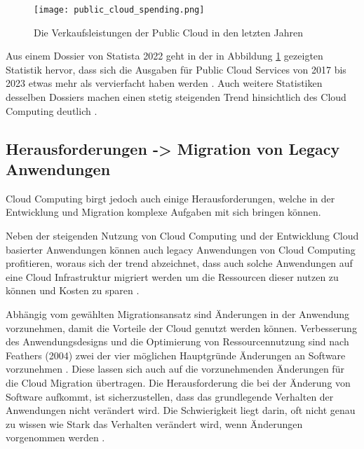 \begin{figure}[h]
    \texttt{[image: public\_cloud\_spending.png]}
    \caption{Die Verkaufsleistungen der Public Cloud in den letzten Jahren \cite[S. 8]{Statista2022}}
    \label{fig:public_cloud_spending}
\end{figure}

Aus einem Dossier von Statista 2022 geht in der in Abbildung \ref{fig:public_cloud_spending} gezeigten Statistik hervor, dass sich die Ausgaben für Public Cloud Services von 2017 bis 2023 etwas mehr als vervierfacht haben werden \cite[Vgl.][S. 8]{Statista2022}. Auch weitere Statistiken desselben Dossiers machen einen stetig steigenden Trend hinsichtlich des Cloud Computing deutlich \cite[Vgl. unter anderem][S. 11ff]{Statista2022}. 

\pagebreak

\subsection{Herausforderungen -> Migration von Legacy Anwendungen}
Cloud Computing birgt jedoch auch einige Herausforderungen, welche in der Entwicklung und Migration komplexe Aufgaben mit sich bringen können.

Neben der steigenden Nutzung von Cloud Computing und der Entwicklung Cloud basierter Anwendungen können auch legacy Anwendungen von Cloud Computing profitieren, woraus sich der trend abzeichnet, dass auch solche Anwendungen auf eine Cloud Infrastruktur migriert werden um die Ressourcen dieser nutzen zu können und Kosten zu sparen \cite[Vgl.][S. 31]{Maenhaut2016}.

Abhängig vom gewählten Migrationsansatz sind Änderungen in der Anwendung vorzunehmen, damit die Vorteile der Cloud genutzt werden können. Verbesserung des Anwendungsdesigns und die Optimierung von Ressourcennutzung sind nach Feathers (2004) zwei der vier möglichen Hauptgründe Änderungen an Software vorzunehmen \cite[Vgl.][S. 3]{Feathers2004}. Diese lassen sich auch auf die vorzunehmenden Änderungen für die Cloud Migration übertragen. Die Herausforderung die bei der Änderung von Software aufkommt, ist sicherzustellen, dass das grundlegende Verhalten der Anwendungen nicht verändert wird. Die Schwierigkeit liegt darin, oft nicht genau zu wissen wie Stark das Verhalten verändert wird, wenn Änderungen vorgenommen werden \cite[Vgl.][S. 7]{Feathers2004}.